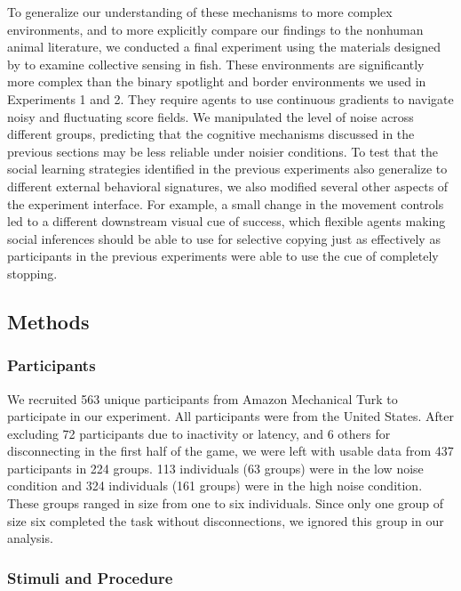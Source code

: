 \documentclass[12pt,letterpaper]{article}
\begin{document}
To generalize our understanding of these mechanisms to more complex environments, and to more explicitly compare our findings to the nonhuman animal literature, we conducted a final experiment using the materials designed by  to examine collective sensing in fish.
These environments are significantly more complex than the binary spotlight and border environments we used in Experiments 1 and 2.
They require agents to use continuous gradients to navigate noisy and fluctuating score fields.
We manipulated the level of noise across different groups, predicting that the cognitive mechanisms discussed in the previous sections may be less reliable under noisier conditions. To test that the social learning strategies identified in the previous experiments also generalize to different external behavioral signatures, we also modified several other aspects of the experiment interface.
For example, a small change in the movement controls led to a different downstream visual cue of success, which flexible agents making social inferences should be able to use for selective copying just as effectively as participants in the previous experiments were able to use the cue of completely stopping.

\subsection{Methods}
\subsubsection{Participants}

We recruited 563 unique participants from Amazon Mechanical Turk to participate in our experiment.
All participants were from the United States.
After excluding 72 participants due to inactivity or latency, and 6 others for disconnecting in the first half of the game, we were left with usable data from 437 participants in 224 groups.
113 individuals (63 groups) were in the low noise condition and 324 individuals (161 groups) were in the high noise condition. 
These groups ranged in size from one to six individuals.  
Since only one group of size six completed the task without disconnections, we ignored this group in our analysis.

\subsubsection{Stimuli and Procedure}
\end{document}
